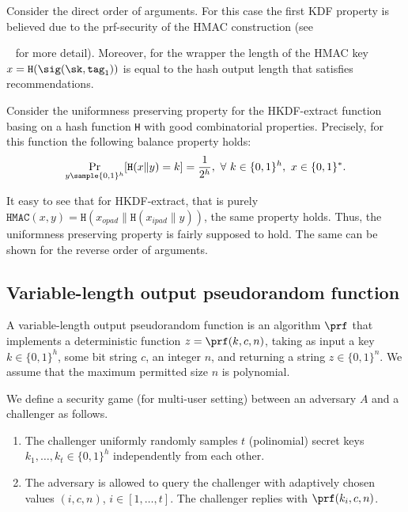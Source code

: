 \documentclass{article}
\begin{document}
Consider the direct order of arguments. For this case the first KDF property is believed due to the prf-security of the HMAC construction (see{~\cite{BellareCK1996} for more detail). Moreover, for the wrapper the length of the HMAC key $x = \texttt{H}(\sig (\sk, \texttt{tag}_1))$ is equal to the hash output length that satisfies recommendations.    
	
	Consider the uniformness preserving property for the HKDF-extract function basing on a hash function \texttt{H} with good combinatorial properties. Precisely, for this function the following balance property holds:	
$$\Pr_{y \sample \{0,1\}^h}[ \texttt{H} (x\|y) = k ] = \frac{1}{2^h},\ \forall\ k \in \{0,1\}^h,\ x \in \{0,1\}^*.$$

It easy to see that for HKDF-extract, that is purely $\texttt{HMAC} (x,y) = \texttt{H}(x_{opad}\|\texttt{H}(x_{ipad}\|y))$, the same property holds. Thus, the uniformness preserving property is fairly supposed to hold. The same can be shown for the reverse order of arguments.


\subsection{Variable-length output pseudorandom function} \label{PRFdef}


A variable-length output pseudorandom function is an algorithm $\prf$ that implements a deterministic function $z=\prf(k, c, n)$, taking as input a key $k \in \{0,1\}^h$, some bit string $c$, an integer $n$, and returning a string $z \in \{0, 1 \}^{n}$. We assume that the maximum permitted size $n$ is polynomial. %

We define a security game (for multi-user setting) between an adversary $A$ and a challenger as follows.

\begin{enumerate}
	\item The challenger uniformly randomly samples $t$ (polinomial) secret keys $k_1,\ldots,k_t \in \{0,1\}^h$ independently from each other.
	
	\item The adversary is allowed to query the challenger with adaptively chosen values $(i,c,n)$, $i \in [1,\ldots,t]$. The challenger replies with $\prf(k_i, c,n)$.
	

\end{enumerate}}
\end{document}
